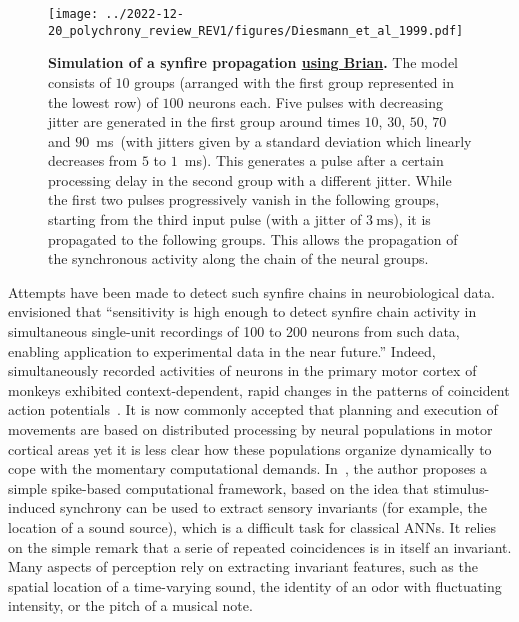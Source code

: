 \documentclass[brainsci, %
               review,submit,pdftex,moreauthors
               ]{Definitions/mdpi}
\newcommand{\ms}{\si{\milli\second}}%
\begin{document}
\begin{figure}
\centering
\texttt{[image: ../2022-12-20\_polychrony\_review\_REV1/figures/Diesmann\_et\_al\_1999.pdf]}
\caption{\textbf{Simulation of a synfire propagation \href{https://brian2.readthedocs.io/en/stable/examples/frompapers.Diesmann_et_al_1999.html}{using Brian}.} The model consists of $10$ groups (arranged with the first group represented in the lowest row) of $100$ neurons each. Five pulses with decreasing jitter are generated in the first group around times $10$, $30$, $50$, $70$ and $90$~\ms~(with jitters given by a standard deviation which linearly decreases from $5$ to $1$~\ms). This generates a pulse after a certain processing delay in the second group with a different jitter. While the first two pulses progressively vanish in the following groups, starting from the third input pulse (with a jitter of $3~\ms$), it is propagated to the following groups. This allows the propagation of the synchronous activity along the chain of the neural groups.}\label{fig:diesman}
\end{figure}

Attempts have been made to detect such synfire chains in neurobiological data.~\citet{schrader_detecting_2008} envisioned that ``sensitivity is high enough to detect synfire chain activity in simultaneous single-unit recordings of 100 to 200 neurons from such data, enabling application to experimental data in the near future.'' Indeed, simultaneously recorded activities of neurons in the primary motor cortex of monkeys exhibited context-dependent, rapid changes in the patterns of coincident action potentials~\citep{riehle_spike_1997,grammont_precise_1999}. It is now commonly accepted that planning and execution of movements are based on distributed processing by neural populations in motor cortical areas yet it is less clear  how these populations organize dynamically to cope with the momentary computational demands.  In~\citep{brette_computing_2012}, the author proposes a simple spike-based computational framework, based on the idea that stimulus-induced synchrony can be used to extract sensory invariants (for example, the location of a sound source), which is a difficult task for classical ANNs. It relies on the simple remark that a serie of repeated coincidences is in itself an invariant. Many aspects of perception rely on extracting invariant features, such as the spatial location of a time-varying sound, the identity of an odor with fluctuating intensity, or the pitch of a musical note.
\end{document}
